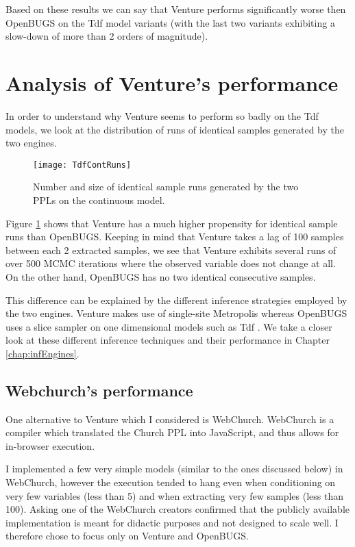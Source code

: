 Based on these results we can say that Venture performs significantly worse then OpenBUGS on the Tdf model variants (with the last two variants exhibiting a slow-down of more than 2 orders of magnitude).

\section{Analysis of Venture's performance}

In order to understand why Venture seems to perform so badly on the Tdf models, we look at the distribution of runs of identical samples generated by the two engines.

\begin{figure}[h]
    \centering
    \texttt{[image: TdfContRuns]}
    \caption{Number and size of identical sample runs generated by the two PPLs on the continuous model.}
    \label{fig:tdfContRun}
\end{figure}

Figure \ref{fig:tdfContRun} shows that Venture has a much higher propensity for identical sample runs than OpenBUGS. Keeping in mind that Venture takes a lag of 100 samples between each 2 extracted samples, we see that Venture exhibits several runs of over 500 MCMC iterations where the observed variable does not change at all. On the other hand, OpenBUGS has no two identical consecutive samples.

This difference can be explained by the different inference strategies employed by the two engines. Venture makes use of single-site Metropolis whereas OpenBUGS uses a slice sampler on one dimensional models such as Tdf . We take a closer look at these different inference techniques and their performance in Chapter \ref{chap:infEngines}.


\subsection{Webchurch's performance}
One alternative to Venture which I considered is WebChurch. WebChurch is a compiler which translated the Church PPL into JavaScript, and thus allows for in-browser execution.

I implemented a few very simple models (similar to the ones discussed below) in WebChurch, however the execution tended to hang even when conditioning on very few variables (less than 5) and when extracting very few samples (less than 100). Asking one of the WebChurch creators confirmed that the publicly available implementation is meant for didactic purposes and not designed to scale well. I therefore chose to focus only on Venture and OpenBUGS.
